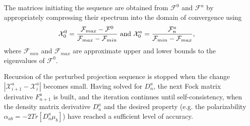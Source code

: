 \documentclass[prl,aps,preprint,showpacs,superbib]{revtex4}
\begin{document}
The matrices initiating the sequence are obtained from $\mathcal{F}^0$
and  $\mathcal{F}^a$ by appropriately 
compressing their spectrum into the domain of convergence \cite{ANiklasson02A} using
\begin{equation}
\mathcal{X}^0_{0}=\frac{\mathcal{F}_{max}-\mathcal{F}^0}{\mathcal{F}_{max}-\mathcal{F}_{min}}~{\rm and}~
\mathcal{X}^a_{0}=\frac{\mathcal{F}^a_{n}}{\mathcal{F}_{min}-\mathcal{F}_{max}},
\end{equation}
where $\mathcal{F}_{min}$ and $\mathcal{F}_{max}$ are approximate upper and lower bounds to the eigenvalues of $\mathcal{F}^0$.

Recursion of the perturbed projection sequence is stopped when the change 
$\left| \mathcal{X}^a_{i+1}-\mathcal{X}^a_i \right|$ becomes small. Having solved for $D^a_n$, 
the next Fock matrix derivative $F^a_{n+1}$ is built, and the iteration continues until 
self-consistency, when the density matrix derivative $D^a_n$ and the desired property 
(e.g. the polarizability $\alpha_{ab}=-2Tr[D^a_n\mu_b]$) have reached a sufficient level of accuracy.

\end{document}

